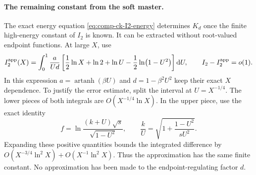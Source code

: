 \paragraph{The remaining constant from the soft master.} The exact
energy equation \eqref{eq:comp-ck-I2-energy} determines $K_d$ once
the finite high-energy constant of $I_2$ is known. It can be extracted
without root-valued endpoint functions. At large $X$, use
\begin{equation}
 I_2^{\rm app}(X)=\int_0^1\frac{a}{Ud}
       \left[\frac12\ln X+\ln2+\ln U-\frac12\ln(1-U^2)\right]\dd U,
 \qquad I_2-I_2^{\rm app}=o(1).
\end{equation}
In this expression $a=\operatorname{artanh}(\beta U)$ and
$d=1-\beta^2U^2$ keep their exact $X$ dependence. To justify the
error estimate, split the interval at $U=X^{-1/4}$. The lower
pieces of both integrals are $O(X^{-1/4}\ln X)$. In the upper piece,
use the exact identity
\begin{equation}
 f=\ln\frac{(k+U)\sqrt s}{\sqrt{1-U^2}},\qquad
 \frac{k}{U}=\sqrt{1+\frac{1-U^2}{sU^2}}.
\end{equation}
Expanding these positive quantities bounds the integrated difference
by $O(X^{-3/4}\ln^2X)+O(X^{-1}\ln^2X)$. Thus the approximation
has the same finite constant. No approximation has been made to the
endpoint-regulating factor $d$.

